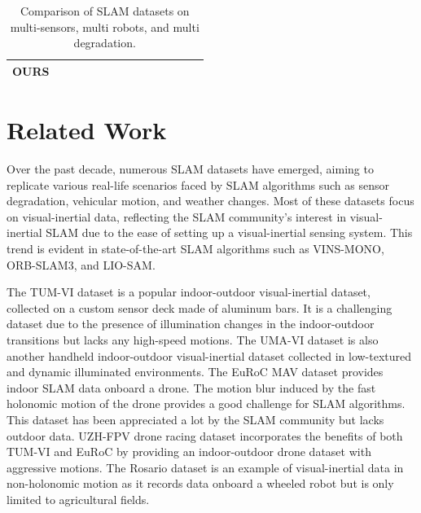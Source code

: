 \documentclass[10pt,twocolumn,letterpaper]{article}
\newcommand{\cc}{\color[rgb]{0,0.6,0.3}\checkmark}
\begin{document}
\begin{table}[h!]
\begin{center}
{\begin{tabular}{l|cccc|ccccc|cccc|}
			\textbf{OURS}                                    & \cc & \cc & \cc & \cc & \cc & \cc & \cc & \cc & \cc & \cc  & \cc & \cc & \cc \\ \hline
		\end{tabular} 
        }
	\vspace{-0.1in}
	\end{center}
	\caption{Comparison of SLAM datasets on multi-sensors, multi robots, and multi degradation.}
	\vspace{-0.1in}
	\label{Tab:dataset_compare}
\end{table}
\section{Related Work} \label{sec:related_work}


Over the past decade, numerous SLAM datasets have emerged, aiming to replicate various real-life scenarios faced by SLAM algorithms such as sensor degradation, vehicular motion, and weather changes. Most of these datasets focus on visual-inertial data, reflecting the SLAM community's interest in visual-inertial SLAM due to the ease of setting up a visual-inertial sensing system. This trend is evident in state-of-the-art SLAM algorithms such as VINS-MONO, ORB-SLAM3, and LIO-SAM\cite{vins-mono, orb-slam3, liosam2020shan}.


The TUM-VI dataset\cite{schubert2018tum} is a popular indoor-outdoor visual-inertial dataset, collected on a custom sensor deck made of aluminum bars. It is a challenging dataset due to the presence of illumination changes in the indoor-outdoor transitions but lacks any high-speed motions. The UMA-VI dataset\cite{zuniga2020vi} is also another handheld indoor-outdoor visual-inertial dataset collected in low-textured and dynamic illuminated environments. The EuRoC MAV dataset\cite{Burri25012016} provides indoor SLAM data onboard a drone. The motion blur induced by the fast holonomic motion of the drone provides a good challenge for SLAM algorithms. This dataset has been appreciated a lot by the SLAM community but lacks outdoor data. UZH-FPV drone racing dataset\cite{Delmerico19icra} incorporates the benefits of both TUM-VI and EuRoC by providing an indoor-outdoor drone dataset with aggressive motions. The Rosario dataset\cite{rosario} is an example of visual-inertial data in non-holonomic motion as it records data onboard a wheeled robot but is only limited to agricultural fields.
\end{document}
